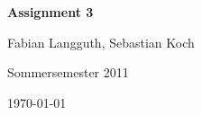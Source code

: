 



% 

\begin{center}
    \huge {\bf Assignment 3}
    
    \small Fabian Langguth, Sebastian Koch
    
    Sommersemester 2011
    
    \today
\end{center}
%



